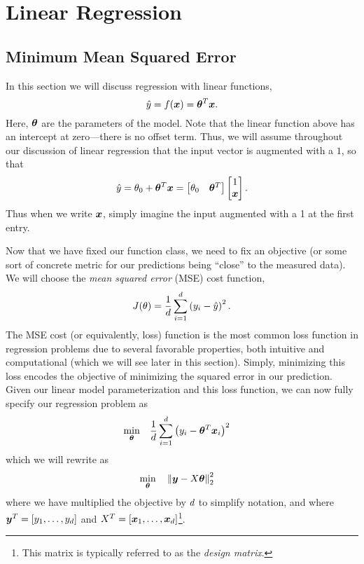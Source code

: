 \section{Linear Regression}

\subsection{Minimum Mean Squared Error}

In this section we will discuss regression with linear functions, 
\begin{equation}
    \hat{y} = f(\bm{x}) = \bm{\theta}^T \bm{x}.
\end{equation}
Here, $\bm{\theta}$ are the parameters of the model. Note that the linear function above has an intercept at zero---there is no offset term. Thus, we will assume throughout our discussion of linear regression that the input vector is augmented with a $1$, so that 
\begin{equation}
    \hat{y} = \theta_0 + \bm{\theta}^T \bm{x} = 
    \begin{bmatrix}
    \theta_0 & \bm{\theta}^T 
    \end{bmatrix} 
    \begin{bmatrix}
    1\\
    \bm{x}
    \end{bmatrix}.
\end{equation}
Thus when we write $\bm{x}$, simply imagine the input augmented with a 1 at the first entry. 

Now that we have fixed our function class, we need to fix an objective (or some sort of concrete metric for our predictions being ``close'' to the measured data). We will choose the \textit{mean squared error} (MSE) cost function, 
\begin{equation}
    J(\theta) = \frac{1}{d}\sum_{i=1}^{d} \left( y_i - \hat{y} \right)^2.
\end{equation}
The MSE cost (or equivalently, loss) function is the most common loss function in regression problems due to several favorable properties, both intuitive and computational (which we will see later in this section). Simply, minimizing this loss encodes the objective of minimizing the squared error in our prediction. Given our linear model parameterization and this loss function, we can now fully specify our regression problem as 
\begin{equation}
\begin{aligned}
& \underset{\bm{\theta}}{\min}
& & \frac{1}{d}\sum_{i=1}^{d} \left( y_i - \bm{\theta}^T \bm{x}_i \right)^2
\end{aligned}
\end{equation}
which we will rewrite as 
\begin{equation}
\begin{aligned}
& \underset{\bm{\theta}}{\min}
& & \left\| \bm{y} - X \bm{\theta} \right\|_2^2
\end{aligned}
\label{eq:least_squares}
\end{equation}
where we have multiplied the objective by $d$ to simplify notation, and where $\bm{y}^T = [y_1, \ldots, y_d]$ and $X^T = [\bm{x}_1, \ldots, \bm{x}_d]$\footnote{This matrix is typically referred to as the \textit{design matrix}.}. 

